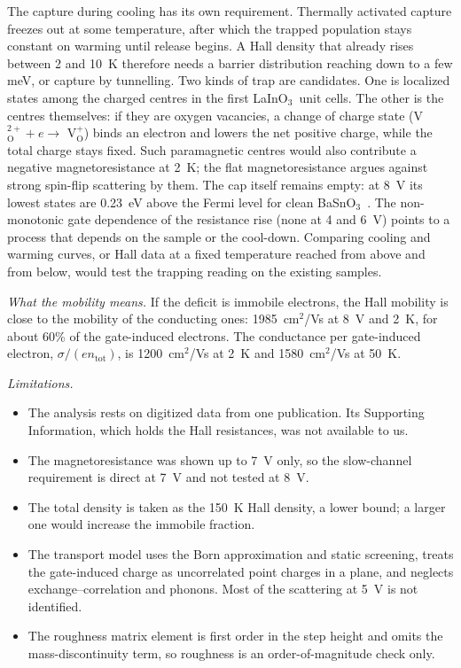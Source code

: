 \documentclass[11pt]{article}
\newcommand{\LIO}{\texorpdfstring{LaInO$_3$}{LaInO3}}
\newcommand{\BSO}{\texorpdfstring{BaSnO$_3$}{BaSnO3}}
\newcommand{\ntot}{n_\mathrm{tot}}
\begin{document}
The capture during cooling has its own requirement. Thermally activated capture freezes out at some temperature, after which the trapped population stays constant on warming until release begins. A Hall density that already rises between 2 and 10~K therefore needs a barrier distribution reaching down to a few meV, or capture by tunnelling. Two kinds of trap are candidates. One is localized states among the charged centres in the first \LIO\ unit cells. The other is the centres themselves: if they are oxygen vacancies, a change of charge state (V$_\mathrm{O}^{2+}+e\rightarrow$ V$_\mathrm{O}^{+}$) binds an electron and lowers the net positive charge, while the total charge stays fixed. Such paramagnetic centres would also contribute a negative magnetoresistance at 2~K; the flat magnetoresistance argues against strong spin-flip scattering by them. The cap itself remains empty: at 8~V its lowest states are 0.23~eV above the Fermi level for clean \BSO\ \cite{OwnbyMAT02}. The non-monotonic gate dependence of the resistance rise (none at 4 and 6~V) points to a process that depends on the sample or the cool-down. Comparing cooling and warming curves, or Hall data at a fixed temperature reached from above and from below, would test the trapping reading on the existing samples.

\emph{What the mobility means.} If the deficit is immobile electrons, the Hall mobility is close to the mobility of the conducting ones: 1985~cm$^2$/Vs at 8~V and 2~K, for about 60\% of the gate-induced electrons. The conductance per gate-induced electron, $\sigma/(e\ntot)$, is 1200~cm$^2$/Vs at 2~K and 1580~cm$^2$/Vs at 50~K.

\emph{Limitations.}
\begin{itemize}
\item The analysis rests on digitized data from one publication. Its Supporting Information, which holds the Hall resistances, was not available to us.
\item The magnetoresistance was shown up to 7~V only, so the slow-channel requirement is direct at 7~V and not tested at 8~V.
\item The total density is taken as the 150~K Hall density, a lower bound; a larger one would increase the immobile fraction.
\item The transport model uses the Born approximation and static screening, treats the gate-induced charge as uncorrelated point charges in a plane, and neglects exchange--correlation and phonons. Most of the scattering at 5~V is not identified.
\item The roughness matrix element is first order in the step height and omits the mass-discontinuity term, so roughness is an order-of-magnitude check only.
\end{itemize}
\end{document}
